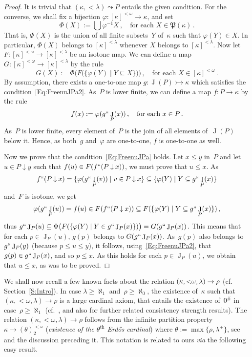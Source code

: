 \documentclass[psamsfonts,reqno]{amsart}
\theoremstyle{plain}
\theoremstyle{definition}
\theoremstyle{remark}
\numberwithin{equation}{section}
\numberwithin{figure}{section}
\newcommand{\gf}{\varphi}
\newcommand{\gk}{\kappa}
\newcommand{\gl}{\lambda}
\newcommand{\gq}{\theta}
\newcommand{\gr}{\rho}
\newcommand{\go}{\omega}
\DeclareMathOperator{\J}{J}
\newcommand{\Pow}{\mathfrak{P}}
\newcommand{\mono}{\rightarrowtail}
\newcommand{\set}[1]{\{#1\}}
\newcommand{\setm}[2]{\set{#1\mid#2}}
\newcommand{\dnw}{\mathbin{\downarrow}}
\begin{document}
\begin{proof}
It is trivial that $(\gk,{<}\gl)\leadsto P$ entails the given condition. For the converse, we shall fix a bijection $\gf\colon[\gk]^{<\go}\to\gk$, and set
 \[
 \Phi(X):=\bigcup\gf^{-1}X\,,\quad\text{for each }X\in\Pow(\gk)\,.
 \]
That is, $\Phi(X)$ is the union of all finite subsets~$Y$ of~$\gk$ such that $\gf(Y)\in X$. In particular, $\Phi(X)$ belongs to $[\gk]^{<\gl}$ whenever $X$ belongs to $[\gk]^{<\gl}$.
Now let $F\colon[\gk]^{<\go}\to[\gk]^{<\gl}$ be an isotone map. We can define a map $G\colon[\gk]^{<\go}\to[\gk]^{<\gl}$ by the rule
 \[
 G(X):=\Phi\bigl(F\bigl(\setm{\gf(Y)}{Y\subseteq X}\bigr)\bigr)\,,\quad
 \text{for each }X\in[\gk]^{<\go}\,.
 \]
By assumption, there exists a one-to-one map $g\colon\J(P)\mono\gk$ which satisfies the condition~\eqref{Eq:FreenuJPa2}. As~$P$ is lower finite, we can define a map $f\colon P\to\gk$ by the rule
 \[
 f(x):=\gf(g``\J_P(x))\,,\quad\text{for each }x\in P\,.
 \]
As~$P$ is lower finite, every element of~$P$ is the join of all elements of~$\J(P)$ below it. Hence, as both~$g$ and~$\gf$ are one-to-one, $f$ is one-to-one as well.

Now we prove that the condition~\eqref{Eq:FreenuJPa} holds. Let $x\leq y$ in~$P$ and let $u\in P\dnw y$ such that $f(u)\in F(f``(P\dnw x))$, we must prove that $u\leq x$. As
 \[
 f``(P\dnw x)=\setm{\gf(g``\J_P(v))}{v\in P\dnw x}
 \subseteq\setm{\gf(Y)}{Y\subseteq g``\J_P(x)}
 \]
and~$F$ is isotone, we get
 \[
 \gf(g``\J_P(u))=f(u)\in F(f``(P\dnw x))\subseteq
 F(\setm{\gf(Y)}{Y\subseteq g``\J_P(x)})\,,
 \]
thus $g``\J_P(u)\subseteq\Phi\bigl(F(\setm{\gf(Y)}{Y\in g``\J_P(x)})\bigr)=G(g``\J_P(x))$. This means that for each $p\in\J_P(u)$, $g(p)$ belongs to $G(g``\J_P(x))$. As~$g(p)$ also belongs to $g``\J_P(y)$ (because $p\leq u\leq y$), it follows, using~\eqref{Eq:FreenuJPa2}, that $g(p)\in g``\J_P(x)$, and so $p\leq x$. As this holds for each $p\in\J_P(u)$, we obtain that $u\leq x$, as was to be proved.
\end{proof}

We shall now recall a few known facts about the relation $(\gk,{<}\go,\gl)\to\nobreak\gr$ (cf. Section~\ref{S:Intro}). In case $\gl\geq\aleph_1$ and~$\gr\geq\aleph_0$, the existence of~$\gk$ such that $(\gk,{<}\go,\gl)\to\gr$ is a large cardinal axiom, that entails the existence of~$0^{\#}$ in case~$\gr\geq\aleph_1$ (cf.~\cite{DePa}, and also \cite{Koep84,Koep89} for further related consistency strength results). The relation $(\gk,{<}\go,\gl)\to\gr$ follows from the infinite partition property $\gk\to(\gq)^{<\go}_2$ (\emph{existence of the $\gq^{\mathrm{th}}$ Erd\H{o}s cardinal}) where $\gq:=\max\set{\gr,\gl^+}$, see \cite[Theorem~45.2]{EHMR} and the discussion preceding it. This notation is related to ours \emph{via} the following easy result.
\end{document}
